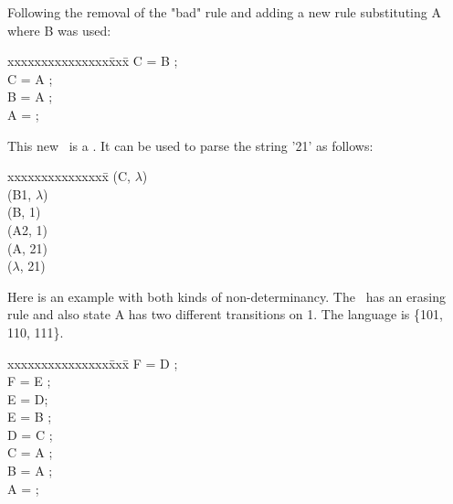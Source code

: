 \noindent Following the removal of the "bad" rule 
 and adding a new rule substituting A where B was used:

\begin{samepage}
\begin{tt}
\begin{tabbing}
xxxxxxxxxxxxxxx\=xxx\=\kill
\>C = B \sq;                 \\
\>C = A \sq;                 \\
\>B = A \sq;                 \\
\>A = ;                           \\
\end{tabbing}
\end{tt}
\end{samepage}

\noindent 
This new \cfg\ is a \dfa.  
It can be used to parse the string '21' as follows:

\begin{tt}
\begin{tabbing}
xxxxxxxxxxxxxxx\=\kill
\>\sform(C, $\lambda$)            \\
\>\sform(B1, $\lambda$)           \\
\>\sform(B,  1)                   \\
\>\sform(A2, 1)                   \\
\>\sform(A, 21)                   \\
\>\sform($\lambda$, 21)
\end{tabbing}
\end{tt}

Here is an example with both kinds of non-determinancy.
The \cfg\ has an erasing rule and also
state A has two different transitions on 1.  
The language is \{101, 110, 111\}.

\begin{samepage}
\begin{tt}
\begin{tabbing}
xxxxxxxxxxxxxxx\=xxx\=\kill
\>F = D \sq;                 \\
\>F = E \sq;                 \\
\>E = D;                          \\
\>E = B \sq;                 \\
\>D = C \sq;                 \\
\>C = A \sq;                 \\
\>B = A \sq;                 \\
\>A = ;                           \\
\end{tabbing}
\end{tt}
\end{samepage}

